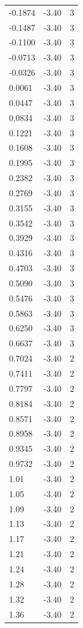 \begin{longtable}{lrr}
  -0.1874 & -3.40 & 3 \\
  -0.1487 & -3.40 & 3 \\
  -0.1100 & -3.40 & 3 \\
  -0.0713 & -3.40 & 3 \\
  -0.0326 & -3.40 & 3 \\
  0.0061 & -3.40 & 3 \\
  0.0447 & -3.40 & 3 \\
  0.0834 & -3.40 & 3 \\
  0.1221 & -3.40 & 3 \\
  0.1608 & -3.40 & 3 \\
  0.1995 & -3.40 & 3 \\
  0.2382 & -3.40 & 3 \\
  0.2769 & -3.40 & 3 \\
  0.3155 & -3.40 & 3 \\
  0.3542 & -3.40 & 3 \\
  0.3929 & -3.40 & 3 \\
  0.4316 & -3.40 & 3 \\
  0.4703 & -3.40 & 3 \\
  0.5090 & -3.40 & 3 \\
  0.5476 & -3.40 & 3 \\
  0.5863 & -3.40 & 3 \\
  0.6250 & -3.40 & 3 \\
  0.6637 & -3.40 & 3 \\
  0.7024 & -3.40 & 2 \\
  0.7411 & -3.40 & 2 \\
  0.7797 & -3.40 & 2 \\
  0.8184 & -3.40 & 2 \\
  0.8571 & -3.40 & 2 \\
  0.8958 & -3.40 & 2 \\
  0.9345 & -3.40 & 2 \\
  0.9732 & -3.40 & 2 \\
  1.01 & -3.40 & 2 \\
  1.05 & -3.40 & 2 \\
  1.09 & -3.40 & 2 \\
  1.13 & -3.40 & 2 \\
  1.17 & -3.40 & 2 \\
  1.21 & -3.40 & 2 \\
  1.24 & -3.40 & 2 \\
  1.28 & -3.40 & 2 \\
  1.32 & -3.40 & 2 \\
  1.36 & -3.40 & 2 \\

\end{longtable}
